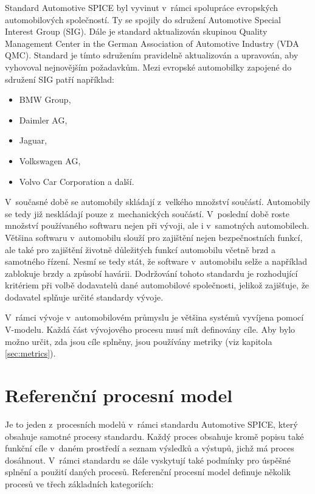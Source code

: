 \documentclass[czech,master]{diploma}
\begin{document}
Standard Automotive SPICE byl vyvinut v~rámci spolupráce evropských automobilových společností. Ty se spojily do sdružení Automotive Special Interest Group (SIG). Dále je standard aktualizován skupinou Quality Management Center in the German Association of Automotive Industry (VDA QMC). Standard je tímto sdružením pravidelně aktualizován a upravován, aby vyhovoval nejnovějším požadavkům. Mezi evropské automobilky zapojené do sdružení SIG patří například:

\begin{itemize}
  \item BMW Group,
  \item Daimler AG,
  \item Jaguar,
  \item Volkswagen AG,
  \item Volvo Car Corporation a další.
\end{itemize}

V~současné době se automobily skládají z~velkého množství součástí. Automobily se tedy již neskládají pouze z~mechanických součástí. V~poslední době roste množství používaného softwaru nejen při vývoji, ale i v~samotných automobilech. Většina softwaru v~automobilu slouží  pro zajištění nejen bezpečnostních funkcí, ale také pro zajištění životně důležitých funkcí automobilu včetně brzd a samotného řízení. Nesmí se tedy stát, že software v~automobilu selže a například zablokuje brzdy a způsobí havárii. Dodržování tohoto standardu je rozhodující kritériem při volbě dodavatelů dané automobilové společnosti, jelikož zajišťuje, že dodavatel splňuje určité standardy vývoje.

V~rámci vývoje v~automobilovém průmyslu je většina systémů vyvíjena pomocí V-modelu. Každá část  vývojového procesu musí mít definovány cíle. Aby bylo možno určit, zda jsou cíle splněny, jsou používány metriky (viz kapitola \ref{sec:metrics}).

\section{Referenční procesní model}
Je to jeden z~procesních modelů v~rámci standardu Automotive SPICE, který obsahuje samotné procesy standardu. Každý proces obsahuje kromě popisu také funkční cíle v~daném prostředí a seznam výsledků a výstupů, jichž má proces dosáhnout. V~rámci standardu se dále vyskytují také podmínky pro úspěšné splnění a použití daných procesů. \cite{ref:aspice_download_procesni_modely} Referenční procesní model definuje několik procesů ve třech základních kategoriích:
\end{document}
